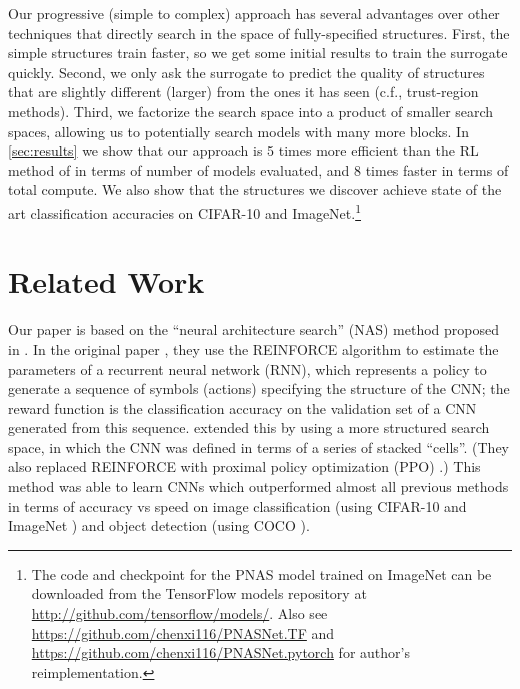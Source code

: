 \documentclass[runningheads]{llncs}
\begin{document}
Our progressive (simple to complex) approach has several advantages over other techniques that directly search in the space of fully-specified structures. First, the simple structures train faster, so we get some initial results to train the surrogate quickly. Second, we only ask the surrogate to predict the quality of structures that are slightly different
(larger) from the ones it has seen
(c.f., trust-region methods). 
Third, we factorize the search space into a product of smaller search spaces, 
allowing us to potentially search models with many more blocks.
In \cref{sec:results} we show that our approach 
is 5 times more efficient than the RL method of \cite{DBLP:journals/corr/ZophVSL17} in terms of number of models evaluated, and 8 times faster in terms of total compute.
We also show that the structures we discover achieve state of the art classification accuracies on CIFAR-10 and ImageNet.\footnote{The code and checkpoint for the PNAS model trained on ImageNet can be downloaded from the TensorFlow models repository at \url{http://github.com/tensorflow/models/}. Also see \url{https://github.com/chenxi116/PNASNet.TF} and \url{https://github.com/chenxi116/PNASNet.pytorch} for author's reimplementation.}
 
\section{Related Work}
\label{sec:related}

Our paper is based on the ``neural architecture search'' (NAS) method proposed in
\cite{DBLP:journals/corr/ZophL16,DBLP:journals/corr/ZophVSL17}.
In the original paper  \cite{DBLP:journals/corr/ZophL16},
they
use the REINFORCE algorithm \cite{Williams92} to estimate the parameters of a
recurrent neural network (RNN),
which represents a policy to generate a sequence of symbols (actions) specifying the structure of the CNN; the reward function is the classification accuracy on the validation set of a CNN generated from this sequence.
\cite{DBLP:journals/corr/ZophVSL17} extended this by using a more structured search space,
in which the CNN was defined in terms of a series of stacked ``cells''.
(They also replaced  REINFORCE with 
proximal policy optimization (PPO) \cite{PPO}.)
This method was able to learn CNNs which outperformed almost all previous methods
in terms of accuracy vs speed on image classification (using
CIFAR-10 \cite{krizhevsky2009learning} and ImageNet \cite{DBLP:conf/cvpr/DengDSLL009})
and object detection (using COCO \cite{DBLP:conf/eccv/LinMBHPRDZ14}).
\end{document}
